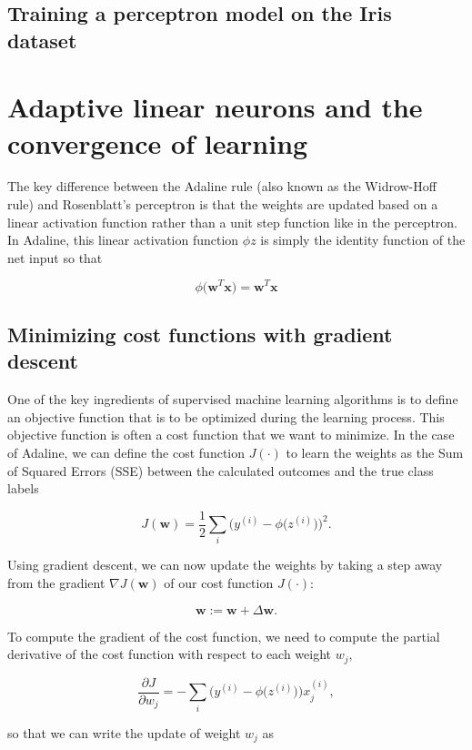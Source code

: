 \documentclass[letterpaper]{report}
\begin{document}
\subsection{Training a perceptron model on the Iris dataset}

\section{Adaptive linear neurons and the convergence of learning}

The key difference between the Adaline rule (also known as the Widrow-Hoff rule) and Rosenblatt's perceptron is that the weights are updated based on a linear activation function rather than a unit step function like in the perceptron. In Adaline, this linear activation function $\phi{z}$ is simply the identity function of the net input so that 

\[
\phi \big( \mathbf{w}^T \mathbf{x} \big) = \mathbf{w}^T \mathbf{x}
\]

\subsection{Minimizing cost functions with gradient descent}

One of the key ingredients of supervised machine learning algorithms is to define an objective function that is to be optimized during the learning process. This objective function is often a cost function that we want to minimize. In the case of Adaline, we can define the cost function $J(\cdot)$ to learn the weights as the Sum of Squared Errors (SSE) between the calculated outcomes and the true class labels

\[
J(\mathbf{w}) = \frac{1}{2} \sum_i \bigg(y^{(i)}  - \phi \big(z^{(i)} \big) \bigg)^2.
\]

Using gradient descent, we can now update the weights by taking a step away from the gradient $\nabla J(\mathbf{w})$ of our cost function $J(\mathbf{\cdot})$:

\[
\mathbf{w} := \mathbf{w} + \Delta \mathbf{w}.
\]

To compute the gradient of the cost function, we need to compute the partial derivative of the cost function with respect to each weight $w_j$,

\[
\frac{\partial J}{\partial w_j} = - \sum_i \bigg( y^{(i)} - \phi \big(z^{(i)} \big) \bigg) x_{j}^{(i)}, 
\]

so that we can write the update of weight $w_j$ as 
\end{document}
